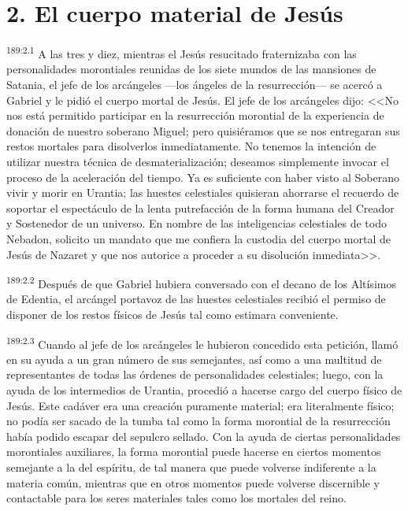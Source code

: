 \section*{2. El cuerpo material de Jesús}
\par 
\textsuperscript{189:2.1} A las tres y diez, mientras el Jesús resucitado fraternizaba con las personalidades morontiales reunidas de los siete mundos de las mansiones de Satania, el jefe de los arcángeles ---los ángeles de la resurrección--- se acercó a Gabriel y le pidió el cuerpo mortal de Jesús. El jefe de los arcángeles dijo: <<No nos está permitido participar en la resurrección morontial de la experiencia de donación de nuestro soberano Miguel; pero quisiéramos que se nos entregaran sus restos mortales para disolverlos inmediatamente. No tenemos la intención de utilizar nuestra técnica de desmaterialización; deseamos simplemente invocar el proceso de la aceleración del tiempo. Ya es suficiente con haber visto al Soberano vivir y morir en Urantia; las huestes celestiales quisieran ahorrarse el recuerdo de soportar el espectáculo de la lenta putrefacción de la forma humana del Creador y Sostenedor de un universo. En nombre de las inteligencias celestiales de todo Nebadon, solicito un mandato que me confiera la custodia del cuerpo mortal de Jesús de Nazaret y que nos autorice a proceder a su disolución inmediata>>.

\par 
\textsuperscript{189:2.2} Después de que Gabriel hubiera conversado con el decano de los Altísimos de Edentia, el arcángel portavoz de las huestes celestiales recibió el permiso de disponer de los restos físicos de Jesús tal como estimara conveniente.

\par 
\textsuperscript{189:2.3} Cuando al jefe de los arcángeles le hubieron concedido esta petición, llamó en su ayuda a un gran número de sus semejantes, así como a una multitud de representantes de todas las órdenes de personalidades celestiales; luego, con la ayuda de los intermedios de Urantia, procedió a hacerse cargo del cuerpo físico de Jesús. Este cadáver era una creación puramente material; era literalmente físico; no podía ser sacado de la tumba tal como la forma morontial de la resurrección había podido escapar del sepulcro sellado. Con la ayuda de ciertas personalidades morontiales auxiliares, la forma morontial puede hacerse en ciertos momentos semejante a la del espíritu, de tal manera que puede volverse indiferente a la materia común, mientras que en otros momentos puede volverse discernible y contactable para los seres materiales tales como los mortales del reino.

